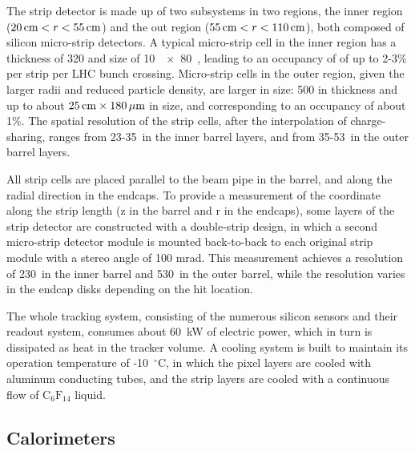 The strip detector is made up of two subsystems in two regions, the inner region ($20 \,\text{cm} < r < 55 \,\text{cm}$) 
and the out region ($55 \,\text{cm} < r < 110 \,\text{cm}$), both composed of silicon micro-strip detectors. 
A typical micro-strip cell in the inner region has a thickness of 320 \mum and size of 10~\cm~$\times$~80~\mum,
leading to an occupancy of of up to 2-3\% per strip per LHC bunch crossing.
Micro-strip cells in the outer region, given the larger radii and reduced particle density, are larger in size:
500 \mum in thickness and up to about $25 \,\text{cm} \times 180 \,\mu\text{m}$ in size,
and corresponding to an occupancy of about 1\%.
The spatial resolution of the strip cells, after the interpolation of charge-sharing, 
ranges from 23-35~\mum in the inner barrel layers, and from 35-53~\mum in the outer barrel layers.  

All strip cells are placed parallel to the beam pipe in the barrel, and along the radial direction in the endcaps.
To provide a measurement of the coordinate along the strip length (z in the barrel and r in the endcaps),
some layers of the strip detector are constructed with a double-strip design, 
in which a second micro-strip detector module is mounted back-to-back to each original strip module with a stereo angle of 100 mrad. 
This measurement achieves a resolution of 230~\mum in the inner barrel and 530~\mum in the outer barrel, 
while the resolution varies in the endcap disks depending on the hit location.

The whole tracking system, consisting of the numerous silicon sensors and their readout system,
consumes about 60~kW of electric power, which in turn is dissipated as heat in the tracker volume.
A cooling system is built to maintain its operation temperature of -10~${}^{\circ}$C, 
in which the pixel layers are cooled with aluminum conducting tubes, 
and the strip layers are cooled with a continuous flow of $\text{C}_{6}\text{F}_{14}$ liquid.


\subsection{Calorimeters}\label{sec:calos}

